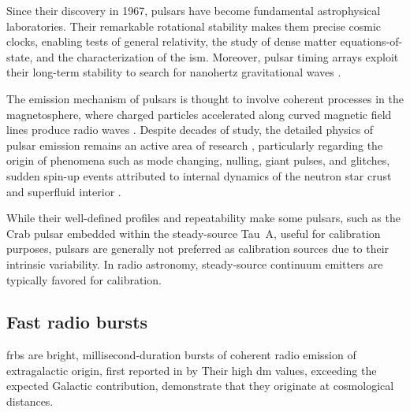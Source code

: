 Since their discovery in 1967, pulsars have become fundamental astrophysical laboratories. Their remarkable rotational stability makes them precise cosmic clocks, enabling tests of general relativity, the study of dense matter equations-of-state, and the characterization of the \gls{ism}. Moreover, pulsar timing arrays \citep{PulsarTimingArray} exploit their long-term stability to search for nanohertz gravitational waves \citep{Bernardo_2025}.

The emission mechanism of pulsars is thought to involve coherent processes in the magnetosphere, where charged particles accelerated along curved magnetic field lines produce radio waves \citep{mitra2024decodingnaturecoherentradio}. Despite decades of study, the detailed physics of pulsar emission remains an active area of research \citep{Melrose_2016}, particularly regarding the origin of phenomena such as mode changing, nulling, giant pulses, and glitches, sudden spin-up events attributed to internal dynamics of the neutron star crust and superfluid interior \citep{Antonopoulou2022,zubieta2024timingirregularitiesglitchespulsar}.

While their well-defined profiles and repeatability make some pulsars, such as the Crab pulsar \citep{B_hler_2014} embedded within the steady-source Tau~A, useful for calibration purposes, pulsars are generally not preferred as calibration sources due to their intrinsic variability. In radio astronomy, steady-source continuum emitters are typically favored for calibration.


\subsection{Fast radio bursts}
\label{sec:frbs}

\glspl{frb} are bright, millisecond-duration bursts of coherent radio emission of extragalactic origin, first reported in \citeyear{Lorimer_2007} by \citeauthor{Lorimer_2007} Their high \gls{dm} values, exceeding the expected Galactic contribution, demonstrate that they originate at cosmological distances.


